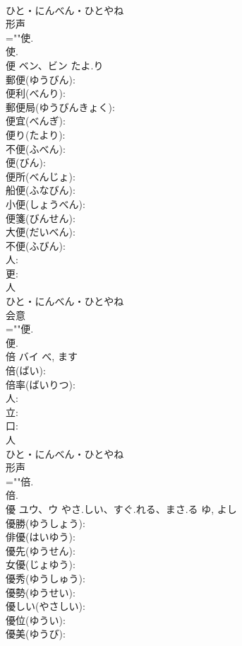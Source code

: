 \documentclass[8pt]{extreport}
\begin{document}
\begin{CJK}{UTF8}{min}
\\	ひと・にんべん・ひとやね	
\\	形声 
\\	=""使.
\\	使.
\\	便	ベン、ビン	たよ.り		
\\	郵便(ゆうびん): 
\\	便利(べんり): 
\\	郵便局(ゆうびんきょく): 
\\	便宜(べんぎ): 
\\	便り(たより): 
\\	不便(ふべん): 
\\	便(びん): 
\\	便所(べんじょ): 
\\	船便(ふなびん): 
\\	小便(しょうべん): 
\\	便箋(びんせん): 
\\	大便(だいべん): 
\\	不便(ふびん): 
\\	人: 
\\	更: 
\\	人	
\\	ひと・にんべん・ひとやね	
\\	会意 
\\	=""便.
\\	便.
\\	倍	バイ		べ, ます	
\\	倍(ばい): 
\\	倍率(ばいりつ): 
\\	人: 
\\	立: 
\\	口: 
\\	人	
\\	ひと・にんべん・ひとやね	
\\	形声 
\\	=""倍.
\\	倍.
\\	優	ユウ、ウ	やさ.しい、すぐ.れる、まさ.る	ゆ, よし	
\\	優勝(ゆうしょう): 
\\	俳優(はいゆう): 
\\	優先(ゆうせん): 
\\	女優(じょゆう): 
\\	優秀(ゆうしゅう): 
\\	優勢(ゆうせい): 
\\	優しい(やさしい): 
\\	優位(ゆうい): 
\\	優美(ゆうび): 

\end{CJK}
\end{document}
